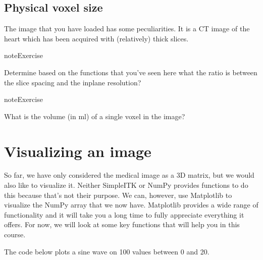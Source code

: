 \documentclass[letterpaper,10pt,english]{jupyterBook}
\begin{document}
\subsection{Physical voxel size}
\label{\detokenize{notebooks/Tutorial1_NumpySimpleITK/Tutorial1_NumpySimpleITK_student:physical-voxel-size}}
\sphinxAtStartPar
The image that you have loaded has some peculiarities. It is a CT image of the heart which has been acquired with (relatively) thick slices.

\begin{sphinxadmonition}{note}{Exercise}

\sphinxAtStartPar
Determine \sphinxhyphen{} based on the functions that you’ve seen here \sphinxhyphen{} what the ratio is between the slice spacing and the in\sphinxhyphen{}plane resolution?
\end{sphinxadmonition}

\begin{sphinxadmonition}{note}{Exercise}

\sphinxAtStartPar
What is the volume (in ml) of a single voxel in the image?
\end{sphinxadmonition}


\section{Visualizing an image}
\label{\detokenize{notebooks/Tutorial1_NumpySimpleITK/Tutorial1_NumpySimpleITK_student:visualizing-an-image}}
\sphinxAtStartPar
So far, we have only considered the medical image as a 3D matrix, but we would also like to visualize it. Neither SimpleITK or NumPy provides functions to do this because that’s not their purpose. We can, however, use Matplotlib to visualize the NumPy array that we now have. Matplotlib provides a wide range of functionality and it will take you a long time to fully appreciate everything it offers. For now, we will look at some key functions that will help you in this course.

\sphinxAtStartPar
The code below plots a sine wave on 100 values between 0 and 20.
\end{document}
